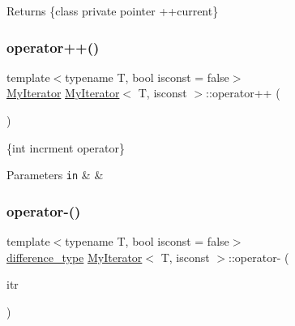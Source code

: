 \begin{DoxyReturn}{Returns}
\{class private pointer ++current\} 
\end{DoxyReturn}
\mbox{\label{classMyIterator_a84b1fec0b90ea0ad1727a52e33f64918}} 
\subsubsection{\texorpdfstring{operator++()}{operator++()}\hspace{0.1cm}{\footnotesize\ttfamily [2/2]}}
{\footnotesize\ttfamily template$<$typename T, bool isconst = false$>$ \\
\hyperlink{classMyIterator}{My\+Iterator} \hyperlink{classMyIterator}{My\+Iterator}$<$ T, isconst $>$\+::operator++ (\begin{DoxyParamCaption}\item[{int}]{ }\end{DoxyParamCaption})\hspace{0.3cm}{\ttfamily [inline]}}



\{int incrment operator\} 


\begin{DoxyParams}[1]{Parameters}
\mbox{\tt in}  & {\em } & \\
\hline
\end{DoxyParams}
\mbox{\label{classMyIterator_ae0a5d53a39a4659af9a3fcc53bc4b9fa}} 
\subsubsection{\texorpdfstring{operator-\/()}{operator-()}\hspace{0.1cm}{\footnotesize\ttfamily [1/2]}}
{\footnotesize\ttfamily template$<$typename T, bool isconst = false$>$ \\
\hyperlink{classMyIterator_ad6844a285132dae3746eab56209a19df}{difference\+\_\+type} \hyperlink{classMyIterator}{My\+Iterator}$<$ T, isconst $>$\+::operator-\/ (\begin{DoxyParamCaption}\item[{\hyperlink{classMyIterator}{My\+Iterator}$<$ T, isconst $>$ \&}]{itr }\end{DoxyParamCaption})\hspace{0.3cm}{\ttfamily [inline]}}



